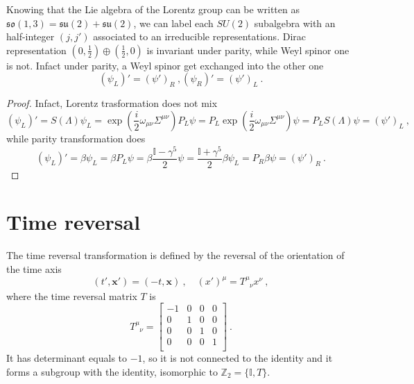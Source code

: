     Knowing that the Lie algebra of the Lorentz group can be written as $\mathfrak{so}(1,3) = \mathfrak{su}(2) + \mathfrak{su}(2)$, we can label each $SU(2)$ subalgebra with an half-integer $(j, j')$ associated to an irreducible representations. Dirac representation $(0, \frac{1}{2}) \oplus (\frac{1}{2}, 0)$ is invariant under parity, while Weyl spinor one is not. Infact under parity, a Weyl spinor get exchanged into the other one
    \begin{equation*}
        (\psi_L)' = (\psi')_R ~, (\psi_R)' = (\psi')_L ~.
    \end{equation*}
    \begin{proof}
        Infact, Lorentz trasformation does not mix
        \begin{equation*}
            (\psi_L)' = S (\Lambda) \psi_L = \exp(\frac{i}{2} \omega_{\mu\nu} \Sigma^{\mu\nu}) P_L \psi = P_L \exp(\frac{i}{2} \omega_{\mu\nu} \Sigma^{\mu\nu}) \psi = P_L S(\Lambda) \psi = (\psi')_L ~,
        \end{equation*}
        while parity transformation does
        \begin{equation*}
            (\psi_L)' = \beta \psi_L = \beta P_L \psi = \beta \frac{\mathbb I - \gamma^5}{2} \psi = \frac{\mathbb I + \gamma^5}{2} \beta \psi_L = P_R \beta \psi = (\psi')_R ~.
        \end{equation*}
    \end{proof}

\section{Time reversal} 

    The time reversal transformation is defined by the reversal of the orientation of the time axis
    \begin{equation*}
        (t', \mathbf x') = (- t, \mathbf x) ~, \quad (x')^\mu = T^\mu_{\phantom \mu \nu} x^\nu ~,
    \end{equation*}
    where the time reversal matrix $T$ is 
    \begin{equation*}
        T^\mu_{\phantom \mu \nu} = \begin{bmatrix}
            -1 & 0 & 0 & 0 \\
            0 & 1 & 0 & 0 \\
            0 & 0 & 1 & 0 \\
            0 & 0 & 0 & 1 \\
        \end{bmatrix} ~.
    \end{equation*}
    It has determinant equals to $-1$, so it is not connected to the identity and it forms a subgroup with the identity, isomorphic to $\mathbb Z_2 = \{\mathbb I, T\}$.

